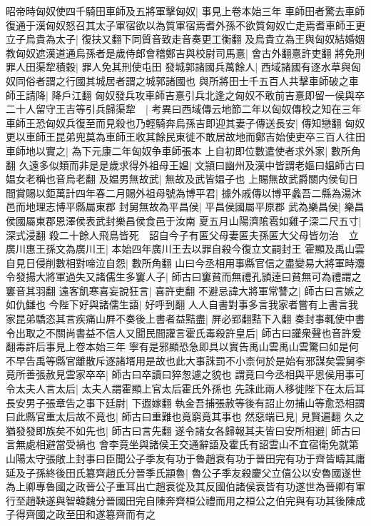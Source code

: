昭帝時匈奴使四千騎田車師及五將軍擊匈奴|{
	事見上卷本始三年}
車師田者驚去車師復通于漢匈奴怒召其太子軍宿欲以為質軍宿焉耆外孫不欲質匈奴亡走焉耆車師王更立子烏貴為太子|{
	復扶又翻下同質音致走音奏更工衡翻}
及烏貴立為王與匈奴結婚姻教匈奴遮漢道通烏孫者是歲侍郎會稽鄭吉與校尉司馬憙|{
	會古外翻憙許吏翻}
將免刑罪人田渠犂積穀|{
	罪人免其刑使屯田}
發城郭諸國兵萬餘人|{
	西域諸國有逐水草與匈奴同俗者謂之行國其城居者謂之城郭諸國也}
與所將田士千五百人共擊車師破之車師王請降|{
	降戶江翻}
匈奴發兵攻車師吉憙引兵北逢之匈奴不敢前吉憙即留一侯與卒二十人留守王吉等引兵歸渠犂　|{
	考異曰西域傳云地節二年以匈奴傳校之知在三年}
車師王恐匈奴兵復至而見殺也乃輕騎奔烏孫吉即迎其妻子傳送長安|{
	傳知戀翻}
匈奴更以車師王昆弟兜莫為車師王收其餘民東徙不敢居故地而鄭吉始使吏卒三百人往田車師地以實之|{
	為下元康二年匈奴争車師張本}
上自初即位數遣使者求外家|{
	數所角翻}
久遠多似類而非是是歲求得外祖母王媪|{
	文頴曰幽州及漢中皆謂老嫗曰媪師古曰媪女老稱也音烏老翻}
及媪男無故武|{
	無故及武皆媪子也}
上賜無故武爵關内侯旬日間賞賜以鉅萬計四年春二月賜外祖母號為博平君|{
	據外戚傳以博平蠡吾二縣為湯沐邑而地理志博平縣屬東郡}
封舅無故為平昌侯|{
	平昌侯國屬平原郡}
武為樂昌侯|{
	樂昌侯國屬東郡恩澤侯表武封樂昌侯食邑于汝南}
夏五月山陽濟隂雹如雞子深二尺五寸|{
	深式浸翻}
殺二十餘人飛鳥皆死　詔自今子有匿父母妻匿夫孫匿大父母皆勿治　立廣川惠王孫文為廣川王|{
	本始四年廣川王去以罪自殺今復立文嗣封王}
霍顯及禹山雲自見日侵削數相對啼泣自怨|{
	數所角翻}
山曰今丞相用事縣官信之盡變易大將軍時灋令發揚大將軍過失又諸儒生多窶人子|{
	師古曰窶貧而無禮孔頴逹曰貧無可為禮謂之窶音其羽翻}
遠客飢寒喜妄說狂言|{
	喜許吏翻}
不避忌諱大將軍常讐之|{
	師古曰言嫉之如仇讎也}
今陛下好與諸儒生語|{
	好呼到翻}
人人自書對事多言我家者嘗有上書言我家昆弟驕恣其言疾痛山屛不奏後上書者益黠盡|{
	屏必郢翻黠下入翻}
奏封事輒使中書令出取之不關尚書益不信人又聞民間讙言霍氏毒殺許皇后|{
	師古曰讙衆聲也音許爰翻毒許后事見上卷本始三年}
寧有是邪顯恐急即具以實告禹山雲禹山雲驚曰如是何不早告禹等縣官離散斥逐諸壻用是故也此大事誅罰不小柰何於是始有邪謀矣雲舅李竟所善張赦見雲家卒卒|{
	師古曰卒讀曰猝怱遽之貌也}
謂竟曰今丞相與平恩侯用事可令太夫人言太后|{
	太夫人謂霍顯上官太后霍氏外孫也}
先誅此兩人移徙陛下在太后耳長安男子張章告之事下廷尉|{
	下遐嫁翻}
執金吾捕張赦等後有詔止勿捕山等愈恐相謂曰此縣官重太后故不竟也|{
	師古曰重難也竟窮竟其事也}
然惡端已見|{
	見賢遍翻}
久之猶發發即族矣不如先也|{
	師古曰言先翻}
遂令諸女各歸報其夫皆曰安所相避|{
	師古曰言無處相避當受禍也}
會李竟坐與諸侯王交通辭語及霍氏有詔雲山不宜宿衛免就第山陽太守張敞上封事曰臣聞公子季友有功于魯趙衰有功于晉田完有功于齊皆疇其庸延及子孫終後田氏簒齊趙氏分晉季氏顓魯|{
	魯公子季友殺慶父立僖公以安魯國遂世為上卿專魯國之政晉公子重耳出亡趙衰從及其反國伯諸侯衰皆有功遂世為晉卿有軍行至趙鞅遂與智韓魏分晉國田完自陳奔齊桓公禮而用之桓公之伯完與有功其後陳成子得齊國之政至田和遂簒齊而有之}
